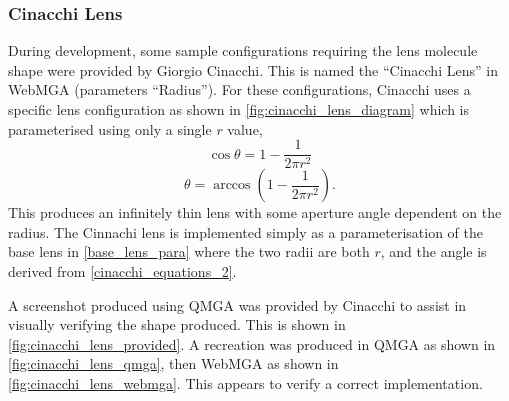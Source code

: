 \subsubsection{Cinacchi Lens}
During development, some sample configurations requiring the lens molecule shape were provided by Giorgio Cinacchi. This is named the ``Cinacchi Lens'' in WebMGA (parameters ``Radius''). For these configurations, Cinacchi uses a specific lens configuration as shown in \cref{fig:cinacchi_lens_diagram} which is parameterised using only a single $r$ value,
\begin{equation}
\cos\theta=1-\frac{1}{2\pi r^2}
\label{cinacchi_equations_1}
\end{equation}
\begin{equation}
\theta=\arccos\left(1-\frac{1}{2\pi r^2}\right).
\label{cinacchi_equations_2}
\end{equation}
This produces an infinitely thin lens with some aperture angle dependent on the radius. The Cinnachi lens is implemented simply as a parameterisation of the base lens in \cref{base_lens_para} where the two radii are both $r$, and the angle is derived from \cref{cinacchi_equations_2}.

A screenshot produced using QMGA was provided by Cinacchi to assist in visually verifying the shape produced. This is shown in \cref{fig:cinacchi_lens_provided}. A recreation was produced in QMGA as shown in \cref{fig:cinacchi_lens_qmga}, then WebMGA as shown in \cref{fig:cinacchi_lens_webmga}. This appears to verify a correct implementation.

